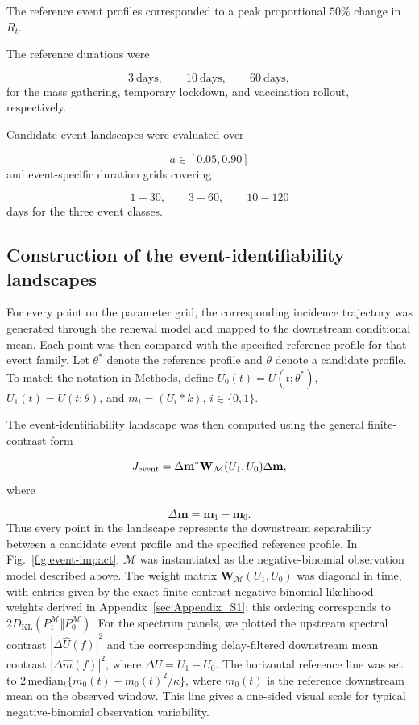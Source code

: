 The reference event profiles corresponded to a peak proportional \(50\%\) change in \(R_t\).

The reference durations were

\[
3~\text{days},
\qquad
10~\text{days},
\qquad
60~\text{days},
\]
for the mass gathering, temporary lockdown, and vaccination rollout, respectively.

Candidate event landscapes were evaluated over

\[
a\in[0.05,0.90]
\]
and event-specific duration grids covering

\[
1\!-\!30,
\qquad
3\!-\!60,
\qquad
10\!-\!120
\]
days for the three event classes.



\subsection{Construction of the event-identifiability landscapes}

For every point on the parameter grid, the corresponding incidence trajectory was generated through the renewal model and mapped to the downstream conditional mean. Each point was then compared with the specified reference profile for that event family. Let \(\theta^\ast\) denote the reference profile and \(\theta\) denote a candidate profile. To match the notation in Methods, define \(U_0(t)=U(t;\theta^\ast)\), \(U_1(t)=U(t;\theta)\), and \(m_i=(U_i*k)\), \(i\in\{0,1\}\).

The event-identifiability landscape was then computed using the general finite-contrast form

\[
J_{\rm event}
=
\Delta\mathbf m^*
\mathbf W_{\mathcal M}(U_1,U_0)
\Delta\mathbf m,
\]
where

\[
\Delta\mathbf m
=
\mathbf m_1-\mathbf m_0.
\]
Thus every point in the landscape represents the downstream separability between a candidate event profile and the specified reference profile. In Fig.~\ref{fig:event-impact}, \(\mathcal M\) was instantiated as the negative-binomial observation model described above. The weight matrix \(\mathbf W_{\mathcal M}(U_1,U_0)\) was diagonal in time, with entries given by the exact finite-contrast negative-binomial likelihood weights derived in Appendix~\ref{sec:Appendix_S1}; this ordering corresponds to \(2D_{\mathrm{KL}}(P_1^{\mathcal M}\Vert P_0^{\mathcal M})\). For the spectrum panels, we plotted the upstream spectral contrast \(|\Delta\widehat U(f)|^2\) and the corresponding delay-filtered downstream mean contrast \(|\Delta\widehat m(f)|^2\), where \(\Delta U=U_1-U_0\). The horizontal reference line was set to \(2\,\mathrm{median}_t\{m_0(t)+m_0(t)^2/\kappa\}\), where \(m_0(t)\) is the reference downstream mean on the observed window. This line gives a one-sided visual scale for typical negative-binomial observation variability.



